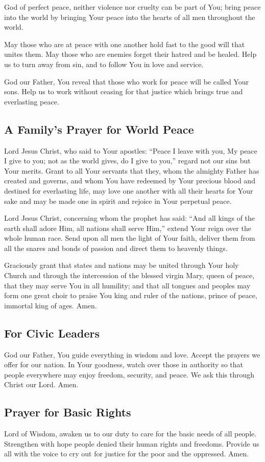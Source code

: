 \documentclass[12pt]{article}
\newcommand{\prayertitle}[1]{\subsection{#1}}
\begin{document}
God of perfect peace, neither violence nor cruelty can be part of You;
bring peace into the world by bringing Your peace into the hearts of all men throughout the world.

May those who are at peace with one another hold fast to the good will that unites them.
May those who are enemies forget their hatred and be healed.
Help us to turn away from sin, and to follow You in love and service.

God our Father, You reveal that those who work for peace will be called Your sons.
Help us to work without ceasing for that justice which brings true and everlasting peace.

\prayertitle{A Family's Prayer for World Peace}
Lord Jesus Christ, who said to Your apostles:
``Peace I leave with you, My peace I give to you;
not as the world gives, do I give to you,''
regard not our sins but Your merits.
Grant to all Your servants that they, whom the almighty Father has created and governs, and whom You have redeemed by Your precious blood and destined for everlasting life, may love one another with all their hearts for Your sake and may be made one in spirit and rejoice in Your perpetual peace.

Lord Jesus Christ, concerning whom the prophet has said:
``And all kings of the earth shall adore Him, all nations shall serve Him,''
extend Your reign over the whole human race.
Send upon all men the light of Your faith, deliver them from all the snares and bonds of passion and direct them to heavenly things.

Graciously grant that states and nations may be united through Your holy Church and through the intercession of the blessed virgin Mary, queen of peace, that they may serve You in all humility;
and that all tongues and peoples may form one great choir to praise You king and ruler of the nations, prince of peace, immortal king of ages.
Amen.

\prayertitle{For Civic Leaders}
God our Father, You guide everything in wisdom and love.
Accept the prayers we offer for our nation.
In Your goodness, watch over those in authority so that people everywhere may enjoy freedom, security, and peace.
We ask this through Christ our Lord.
Amen.

\prayertitle{Prayer for Basic Rights}
Lord of Wisdom, awaken us to our duty to care for the basic needs of all people.
Strengthen with hope people denied their human rights and freedoms.
Provide us all with the voice to cry out for justice for the poor and the oppressed.
Amen.
\end{document}
